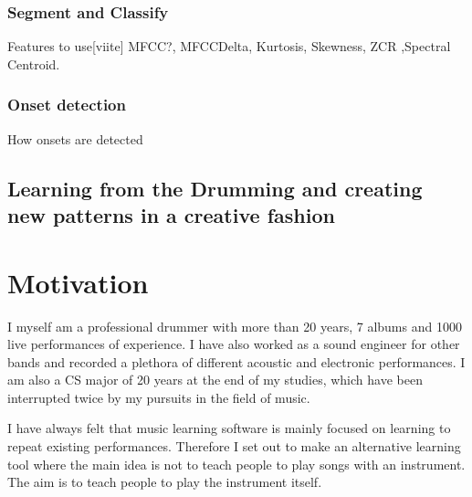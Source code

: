 \documentclass[10pt]{article}
\begin{document}
\subsubsection{Segment and Classify}
Features to use[viite] MFCC?, MFCCDelta, Kurtosis, Skewness, ZCR ,Spectral Centroid.
\subsubsection{Onset detection}
How onsets are detected

\iffalse 
\subsection{Handling Distorted Input Signals}
On a possible portable gaming device the microphone quality is usually low for recording a high sound pressure instrument such as the drums. In order to get reasonable separation of different drums we have to detect and declip clipped audio signal parts of the input. 
$x_{c}[n]=\{\begin{array}{rcl} x[n]&\\x[n]\end{array}$ 
\subsubsection{IHT}
Iterative Hard Threshold
\fi
 \subsection{Learning from the Drumming and creating new patterns in a creative fashion}
 
 \section{Motivation}
I myself am a professional drummer with more than 20 years, 7 albums and 1000 live performances of experience. I have also worked as a sound engineer for other bands and recorded a plethora of different acoustic and electronic performances. I am also a CS major of 20 years at the end of my studies, which have been interrupted twice by my pursuits in the field of music.

I have always felt that music learning software is mainly focused on learning to repeat existing performances. Therefore I set out to make an alternative learning tool where the main idea is not to teach people to play songs with an instrument. The aim is to teach people to play the instrument itself.
\end{document}
